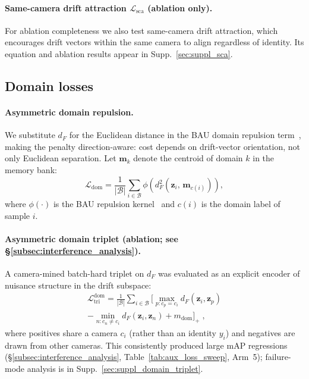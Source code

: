 \paragraph{Same-camera drift attraction $\mathcal{L}_{\mathrm{sca}}$ (ablation only).}
For ablation completeness we also test same-camera drift attraction, which encourages drift vectors within the same camera to align regardless of identity. Its equation and ablation results appear in Supp.~\ref{sec:suppl_sca}. 

\subsection{Domain losses} \label{subsec:domain_losses}

\paragraph{Asymmetric domain repulsion.}
We substitute $d_F$ for the Euclidean distance in the BAU domain repulsion term~\cite{cho2024generalizable}, making the penalty direction-aware: cost depends on drift-vector orientation, not only Euclidean separation. Let $\mathbf{m}_k$ denote the centroid of domain $k$ in the memory bank:
\begin{equation}
    \mathcal{L}_{\mathrm{dom}} = \frac{1}{|\mathcal{B}|}\sum_{i \in \mathcal{B}} \phi\!\left(d_F^2(\mathbf{z}_i,\, \mathbf{m}_{c(i)})\right),
    \label{eq:domain_loss}
\end{equation}
where $\phi(\cdot)$ is the BAU repulsion kernel~\cite{cho2024generalizable} and $c(i)$ is the domain label of sample $i$.

\paragraph{Asymmetric domain triplet (ablation; see \S\ref{subsec:interference_analysis}).}
A camera-mined batch-hard triplet on $d_F$ was evaluated as an explicit encoder of nuisance structure in the drift subspace:
\begin{multline}
    \mathcal{L}_{\mathrm{tri}}^{\mathrm{dom}} = \frac{1}{|\mathcal{B}|}\sum_{i\in\mathcal{B}}\bigl[\max_{p: c_p=c_i} d_F(\mathbf{z}_i,\mathbf{z}_p)
    \\ - \min_{n: c_n\neq c_i} d_F(\mathbf{z}_i,\mathbf{z}_n) + m_{\mathrm{dom}}\bigr]_+ \;,
    \label{eq:domain_triplet}
\end{multline}
where positives share a camera $c_i$ (rather than an identity $y_i$) and negatives are drawn from other cameras. This consistently produced large mAP regressions (\S\ref{subsec:interference_analysis}, Table~\ref{tab:aux_loss_sweep}, Arm~5); failure-mode analysis is in Supp.~\ref{sec:suppl_domain_triplet}.

